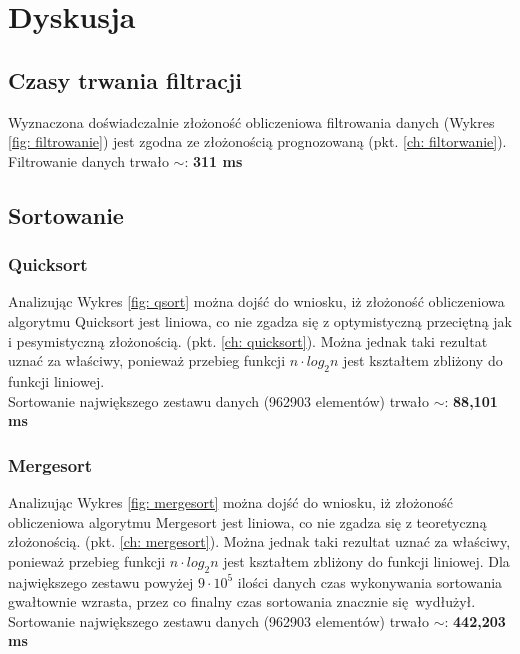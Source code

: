 \documentclass[12pt]{article}
\begin{document}
\section{Dyskusja}

\subsection{Czasy trwania filtracji}

Wyznaczona doświadczalnie złożoność obliczeniowa filtrowania danych (Wykres \ref{fig: filtrowanie}) jest 
zgodna ze złożonością prognozowaną (pkt. \ref{ch: filtorwanie}).\\

Filtrowanie danych trwało $\sim $: \textbf{311 ms}
\subsection{Sortowanie}
\subsubsection{Quicksort}
Analizując Wykres \ref{fig: qsort} można dojść do wniosku, iż złożoność obliczeniowa algorytmu Quicksort jest
liniowa, co nie zgadza się z optymistyczną przeciętną jak i pesymistyczną złożonością. (pkt. \ref{ch: quicksort}). Można 
jednak taki rezultat uznać za właściwy, ponieważ przebieg funkcji $n \cdot log_2 n$ jest kształtem zbliżony do funkcji 
liniowej.\\

Sortowanie największego zestawu danych (962903 elementów) trwało $\sim$: \textbf{88,101 ms}

\subsubsection{Mergesort}


Analizując Wykres \ref{fig: mergesort} można dojść do wniosku, iż złożoność obliczeniowa algorytmu Mergesort jest
liniowa, co nie zgadza się z teoretyczną złożonością. (pkt. \ref{ch: mergesort}). Można 
jednak taki rezultat uznać za właściwy, ponieważ przebieg funkcji $n \cdot log_2 n$ jest kształtem zbliżony do funkcji 
liniowej. Dla największego zestawu powyżej $9 \cdot 10^5$ ilości danych czas wykonywania sortowania gwałtownie wzrasta,
przez co finalny czas sortowania znacznie się wydłużył. \\

Sortowanie największego zestawu danych (962903 elementów) trwało $\sim$: \textbf{442,203 ms}
\end{document}
